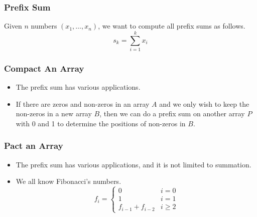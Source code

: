 \documentclass{beamer}
\begin{document}
\begin{CJK}{UTF8}{bsmi}
\begin{frame}
\frametitle{Prefix Sum} Given $n$ numbers $(x_1, \ldots, x_n)$, we
want to compute all prefix sums as follows.
\begin{equation}
s_k = \sum_{i = 1}^k x_i
\end{equation}
\end{frame}

\begin{frame}
\frametitle{Compact An Array}
\begin{itemize}
\item The prefix sum has various applications.
\item If there are zeros and non-zeros in an array $A$ and we only wish to keep the non-zeros in a new array $B$, then we can do a prefix sum on another array $P$ with 0 and 1 to determine the positions of non-zeros in $B$.
\end{itemize}
\end{frame}

\begin{frame}
\frametitle{Pact an Array}
\centerline{}
\end{frame}

\begin{frame}
\begin{itemize}
\frametitle{Fibonacci's Numbers}
\item The prefix sum has various applications, and it is not limited to summation.
\item We all know Fibonacci's numbers. 
\begin{equation}   
f_i = \left\{
\begin{array}{ll}
0 &  i = 0 \\  
1 &  i = 1 \\  
f_{i - 1} + f_{i - 2} &  i \geq 2
\end{array}
\right.
\end{equation}
\end{itemize}
\end{frame}



\end{CJK}
\end{document}
